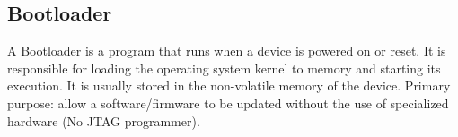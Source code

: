 \subsection*{Bootloader}
A Bootloader is a program that runs when a device is powered on or reset. It is responsible for
loading the operating system kernel to memory and starting its execution. It is usually stored in
the non-volatile memory of the device. Primary purpose: allow a software/firmware to be
updated without the use of specialized hardware (No JTAG programmer).
